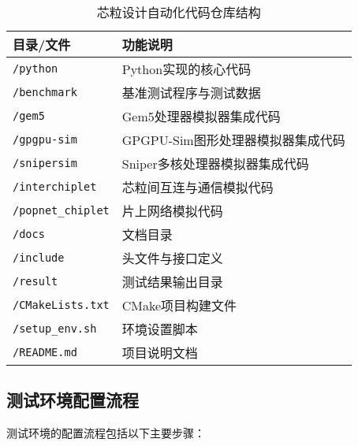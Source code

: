 \documentclass[bachelor]{thesis-uestc}
\begin{document}
\begin{table}[htbp]
    \caption{芯粒设计自动化代码仓库结构}
    \centering
    \begin{tabular}{|l|p{10cm}|}
    \hline
    \textbf{目录/文件} & \textbf{功能说明} \\
    \hline
    \texttt{/python} & Python实现的核心代码 \\
    \hline
    \texttt{/benchmark} & 基准测试程序与测试数据 \\
    \hline
    \texttt{/gem5} & Gem5处理器模拟器集成代码 \\
    \hline
    \texttt{/gpgpu-sim} & GPGPU-Sim图形处理器模拟器集成代码 \\
    \hline
    \texttt{/snipersim} & Sniper多核处理器模拟器集成代码 \\
    \hline
    \texttt{/interchiplet} & 芯粒间互连与通信模拟代码 \\
    \hline
    \texttt{/popnet\_chiplet} & 片上网络模拟代码 \\
    \hline
    \texttt{/docs} & 文档目录 \\
    \hline
    \texttt{/include} & 头文件与接口定义 \\
    \hline
    \texttt{/result} & 测试结果输出目录 \\
    \hline
    \texttt{/CMakeLists.txt} & CMake项目构建文件 \\
    \hline
    \texttt{/setup\_env.sh} & 环境设置脚本 \\
    \hline
    \texttt{/README.md} & 项目说明文档 \\
    \hline
    \end{tabular}
    \label{tab:chiplet_repo_structure}
    \end{table}

\subsection{测试环境配置流程}

测试环境的配置流程包括以下主要步骤：
\end{document}

